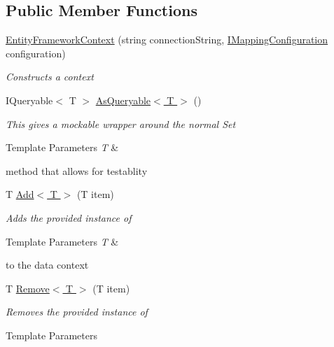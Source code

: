 \subsection*{Public Member Functions}
\begin{DoxyCompactItemize}
\item 
\hyperlink{class_framework_extension_1_1_entity_framework_1_1_contexts_1_1_entity_framework_context_a37fb0de705ec1e6ca5f7cbe39c5e47ae}{Entity\-Framework\-Context} (string connection\-String, \hyperlink{interface_framework_extension_1_1_entity_framework_1_1_mappings_1_1_i_mapping_configuration}{I\-Mapping\-Configuration} configuration)
\begin{DoxyCompactList}\small\item\em Constructs a context \end{DoxyCompactList}\item 
I\-Queryable$<$ T $>$ \hyperlink{class_framework_extension_1_1_entity_framework_1_1_contexts_1_1_entity_framework_context_a56d3f290277a320f9fb8a3045c4d530c}{As\-Queryable$<$ T $>$} ()
\begin{DoxyCompactList}\small\item\em This gives a mockable wrapper around the normal Set
\begin{DoxyTemplParams}{Template Parameters}
{\em T} & \\
\hline
\end{DoxyTemplParams}
method that allows for testablity \end{DoxyCompactList}\item 
T \hyperlink{class_framework_extension_1_1_entity_framework_1_1_contexts_1_1_entity_framework_context_ae3053c572db5a34802107c6734e8d758}{Add$<$ T $>$} (T item)
\begin{DoxyCompactList}\small\item\em Adds the provided instance of 
\begin{DoxyTemplParams}{Template Parameters}
{\em T} & \\
\hline
\end{DoxyTemplParams}
to the data context \end{DoxyCompactList}\item 
T \hyperlink{class_framework_extension_1_1_entity_framework_1_1_contexts_1_1_entity_framework_context_ac56f15278782a2978a3d5f368156ef8d}{Remove$<$ T $>$} (T item)
\begin{DoxyCompactList}\small\item\em Removes the provided instance of 
\begin{DoxyTemplParams}{Template Parameters}

\end{DoxyTemplParams}
\end{DoxyCompactList}
\end{DoxyCompactItemize}
